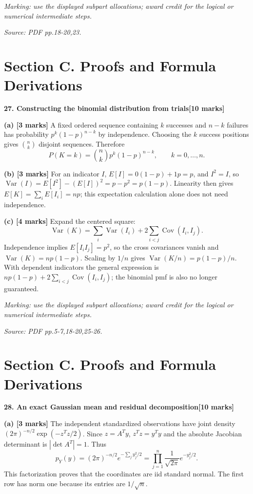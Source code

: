 \documentclass[11pt,a4paper]{article}
\begin{document}
\textit{Marking: use the displayed subpart allocations; award credit for the logical or numerical intermediate steps.}\par
{\footnotesize\textit{Source: PDF pp.18-20,23.}}
\newpage\section*{Section C. Proofs and Formula Derivations}
\textbf{27. Constructing the binomial distribution from trials}\hfill\textbf{[10 marks]}\par\medskip
\textbf{(a) [3 marks]} A fixed ordered sequence containing \(k\) successes and \(n-k\) failures has probability \(p^k(1-p)^{n-k}\) by independence. Choosing the \(k\) success positions gives \(\binom nk\) disjoint sequences. Therefore \[P(K=k)=\binom nkp^k(1-p)^{n-k},\qquad k=0,\ldots,n.\]

\textbf{(b) [3 marks]} For an indicator \(I\), \(E[I]=0(1-p)+1p=p\), and \(I^2=I\), so \(\operatorname{Var}(I)=E[I^2]-(E[I])^2=p-p^2=p(1-p)\). Linearity then gives \(E[K]=\sum_iE[I_i]=np\); this expectation calculation alone does not need independence.

\textbf{(c) [4 marks]} Expand the centered square: \[\operatorname{Var}(K)=\sum_i\operatorname{Var}(I_i)+2\sum_{i<j}\operatorname{Cov}(I_i,I_j).\] Independence implies \(E[I_iI_j]=p^2\), so the cross covariances vanish and \(\operatorname{Var}(K)=np(1-p)\). Scaling by \(1/n\) gives \(\operatorname{Var}(K/n)=p(1-p)/n\). With dependent indicators the general expression is \(np(1-p)+2\sum_{i<j}\operatorname{Cov}(I_i,I_j)\); the binomial pmf is also no longer guaranteed.

\textit{Marking: use the displayed subpart allocations; award credit for the logical or numerical intermediate steps.}\par
{\footnotesize\textit{Source: PDF pp.5-7,18-20,25-26.}}
\newpage\section*{Section C. Proofs and Formula Derivations}
\textbf{28. An exact Gaussian mean and residual decomposition}\hfill\textbf{[10 marks]}\par\medskip
\textbf{(a) [3 marks]} The independent standardized observations have joint density \((2\pi)^{-n/2}\exp(-z^Tz/2)\). Since \(z=A^Ty\), \(z^Tz=y^Ty\) and the absolute Jacobian determinant is \(|\det A^T|=1\). Thus \[p_Y(y)=(2\pi)^{-n/2}e^{-\sum_jy_j^2/2}=\prod_{j=1}^n\frac{1}{\sqrt{2\pi}}e^{-y_j^2/2}.\] This factorization proves that the coordinates are iid standard normal. The first row has norm one because its entries are \(1/\sqrt n\).
\end{document}
